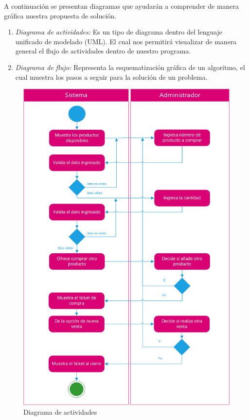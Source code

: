 \documentclass[12pt, letterpaper]{article}
\begin{document}
      A continuación se presentan diagramas que ayudarán a comprender de manera gráfica nuestra propuesta de solución.
         \begin{enumerate}
            \item \textit{Diagrama de actividades:} Es un tipo de diagrama dentro del lenguaje unificado de modelado (UML). El cual nos permitirá visualizar de manera general el flujo de actividades dentro de nuestro programa.
            \item \textit{Diagrama de flujo:} Representa la esquematización gráfica de un algoritmo, el cual muestra los pasos a seguir para la solución de un problema.
        \end{enumerate}
        
    \newpage
      
    \begin{figure}[h]
    \centering
    \includegraphics[scale=0.785]{D-actividades-p1.png}
    \caption {Diagrama de actividades \label{fig:Fig1}}
    \end{figure}
    
\end{document}
